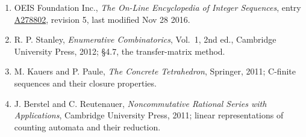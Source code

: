 \documentclass[11pt]{article}
\theoremstyle{definition}
\begin{document}
\begin{enumerate}

\item OEIS Foundation Inc., \emph{The On-Line Encyclopedia of Integer Sequences}, entry \href{https://oeis.org/A278802}{A278802}, revision 5, last modified Nov 28 2016.

\item R. P. Stanley, \emph{Enumerative Combinatorics}, Vol.~1, 2nd ed., Cambridge University Press, 2012; \S4.7, the transfer-matrix method.

\item M. Kauers and P. Paule, \emph{The Concrete Tetrahedron}, Springer, 2011; C-finite sequences and their closure properties.

\item J. Berstel and C. Reutenauer, \emph{Noncommutative Rational Series with Applications}, Cambridge University Press, 2011; linear representations of counting automata and their reduction.

\end{enumerate}
\end{document}
